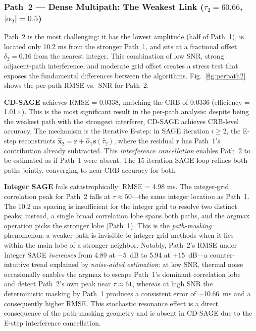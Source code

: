 \documentclass[a4paper,fleqn]{cas-dc}
\begin{document}
\subsubsection{Path~2 --- Dense Multipath: The Weakest Link ($\tau_2 = 60.66$, $|\alpha_2| = 0.5$)}

Path~2 is the most challenging: it has the lowest amplitude (half of Path~1), is located only 10.2 ms from the stronger Path~1, and sits at a fractional offset $\delta_2 = 0.16$ from the nearest integer. This combination of low SNR, strong adjacent-path interference, and moderate grid offset creates a stress test that exposes the fundamental differences between the algorithms. Fig.~\ref{fig:perpath2} shows the per-path RMSE vs.\ SNR for Path~2.

\textbf{CD-SAGE} achieves RMSE = 0.0338, matching the CRB of 0.0336 (efficiency = 1.01$\times$). This is the most significant result in the per-path analysis: despite being the weakest path with the strongest interferer, CD-SAGE achieves CRB-level accuracy. The mechanism is the iterative E-step: in SAGE iteration $i \ge 2$, the E-step reconstructs $\hat{\mathbf{x}}_2 = \mathbf{r} + \hat{\alpha}_2\mathbf{s}(\hat{\tau}_2)$, where the residual $\mathbf{r}$ has Path~1's contribution already subtracted. This \textit{interference cancellation} enables Path~2 to be estimated as if Path~1 were absent. The 15-iteration SAGE loop refines both paths jointly, converging to near-CRB accuracy for both.

\textbf{Integer SAGE} fails catastrophically: RMSE = 4.98 ms. The integer-grid correlation peak for Path~2 falls at $\tau \approx 50$---the same integer location as Path~1. The 10.2 ms spacing is insufficient for the integer grid to resolve two distinct peaks; instead, a single broad correlation lobe spans both paths, and the argmax operation picks the stronger lobe (Path~1). This is the \textit{path-masking} phenomenon: a weaker path is invisible to integer-grid methods when it lies within the main lobe of a stronger neighbor. Notably, Path~2's RMSE under Integer SAGE \textit{increases} from 4.89 at $-5$~dB to 5.94 at $+15$~dB---a counter-intuitive trend explained by \textit{noise-aided estimation}: at low SNR, thermal noise occasionally enables the argmax to escape Path~1's dominant correlation lobe and detect Path~2's own peak near $\tau\approx61$, whereas at high SNR the deterministic masking by Path~1 produces a consistent error of $\sim$10.66~ms and a consequently higher RMSE. This stochastic resonance effect is a direct consequence of the path-masking geometry and is absent in CD-SAGE due to the E-step interference cancellation.
\end{document}
